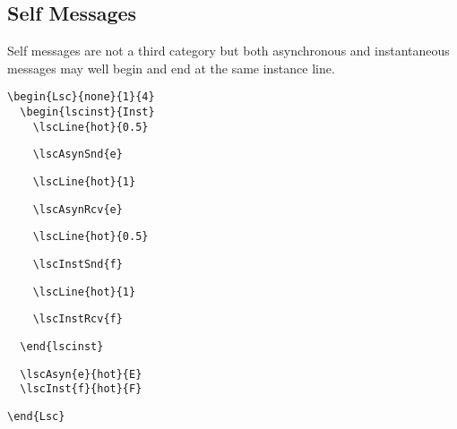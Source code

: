 \documentclass{article}
\begin{document}
\subsection{Self Messages}
\label{sec:msg:self}

Self messages are not a third category but both asynchronous and instantaneous
messages may well begin and end at the same instance line.

\begin{center}%
\begin{minipage}{0.33\textwidth}
\end{minipage}
\hfill
\begin{minipage}{0.33\textwidth}%
\small%
{\gray\begin{verbatim}
\begin{Lsc}{none}{1}{4}
  \begin{lscinst}{Inst}
    \lscLine{hot}{0.5}
\end{verbatim}}%
\verbunskip%
{\begin{verbatim}
    \lscAsynSnd{e}
\end{verbatim}}%
\verbunskip%
{\gray\begin{verbatim}
    \lscLine{hot}{1}
\end{verbatim}}%
\verbunskip%
{\begin{verbatim}
    \lscAsynRcv{e}
\end{verbatim}}%
\verbunskip%
{\gray\begin{verbatim}
    \lscLine{hot}{0.5}
\end{verbatim}}%
\verbunskip%
{\begin{verbatim}
    \lscInstSnd{f}
\end{verbatim}}%
\verbunskip%
{\gray\begin{verbatim}
    \lscLine{hot}{1}
\end{verbatim}}%
\verbunskip%
{\begin{verbatim}
    \lscInstRcv{f}
\end{verbatim}}%
\verbunskip%
{\gray\begin{verbatim}
  \end{lscinst}
\end{verbatim}}%
\verbunskip%
{\begin{verbatim}
  \lscAsyn{e}{hot}{E}
  \lscInst{f}{hot}{F}
\end{verbatim}}%
\verbunskip%
{\gray\begin{verbatim}
\end{Lsc}
\end{verbatim}}%
\end{minipage}
\end{center}%
\end{document}
